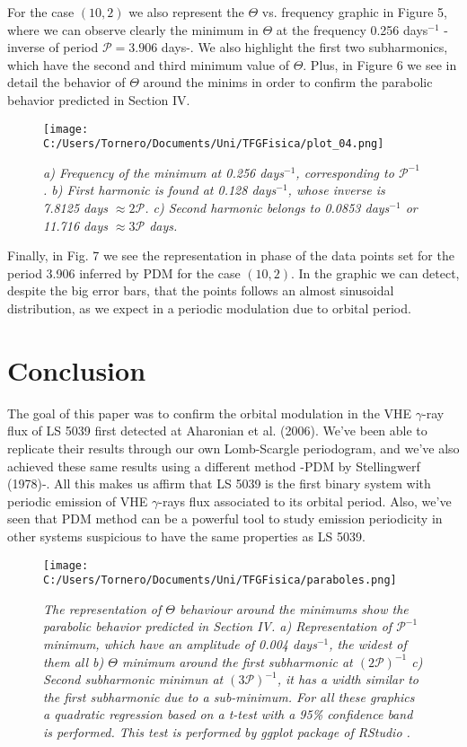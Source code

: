 \documentclass[twocolumn]{revtex4}
\begin{document}
For the case $(10,2)$ we also represent the $\Theta$ vs. frequency graphic in Figure 5, where we can observe clearly the minimum in $\Theta$ at the frequency 0.256 days$^{-1}$ -inverse of period $\mathcal{P} = 3.906$ days-. We also highlight the first two subharmonics, which have the second and third minimum value of $\Theta$. Plus, in Figure 6 we see in detail the behavior of $\Theta$ around the minims in order to confirm the parabolic behavior predicted in Section IV.

\begin{figure}[t]
\centering 
\texttt{[image: C:/Users/Tornero/Documents/Uni/TFGFisica/plot\_04.png]}
\caption{\textit{a) Frequency of the minimum at 0.256 days$^{-1}$, corresponding to $\mathcal{P}^{-1}$. b) First harmonic is found at  0.128 days$^{-1}$, whose inverse is 7.8125 days $\approx 2\mathcal{P}$. c) Second harmonic belongs to 0.0853 days$^{-1}$ or 11.716 days $\approx 3\mathcal{P}$ days.}} 
\label{fig:sample}
\end{figure}


Finally, in Fig. 7 we see the representation in phase of the data points set for the period 3.906 inferred by PDM for the case $(10,2)$. In the graphic we can detect, despite the big error bars, that the points follows an almost sinusoidal distribution, as we expect in a periodic modulation due to orbital period.   

\section{Conclusion}
The goal of this paper was to confirm the orbital modulation in the VHE $\gamma$-ray flux of LS 5039 first detected at Aharonian et al. (2006). We've been able to replicate their results through our own Lomb-Scargle periodogram, and we've also achieved these same results using a different method -PDM by Stellingwerf (1978)-. 
All this makes us affirm that LS 5039 is the first binary system with periodic emission of VHE $\gamma$-rays flux associated to its orbital period. Also, we've seen that PDM method can be a powerful tool to study emission periodicity in other systems suspicious to have the same properties as LS 5039.

\newpage

\begin{figure}[t]
\centering 
\texttt{[image: C:/Users/Tornero/Documents/Uni/TFGFisica/paraboles.png]}
\caption{\textit{The representation of $\Theta$ behaviour around the minimums show the parabolic behavior predicted in Section IV. a) Representation of $\mathcal{P}^{-1}$ minimum, which have an amplitude of 0.004 days$^{-1}$, the widest of them all b) $\Theta$ minimum around the first subharmonic at $(2\mathcal{P})^{-1}$ c) Second subharmonic minimun at $(3\mathcal{P})^{-1}$, it has a width similar to the first subharmonic due to a sub-minimum. For all these graphics a quadratic regression based on a t-test with a 95\% confidence band is performed. This test is performed by ggplot package of RStudio \cite{ggplot}.}}
\label{fig:sample}
\end{figure}
\end{document}
